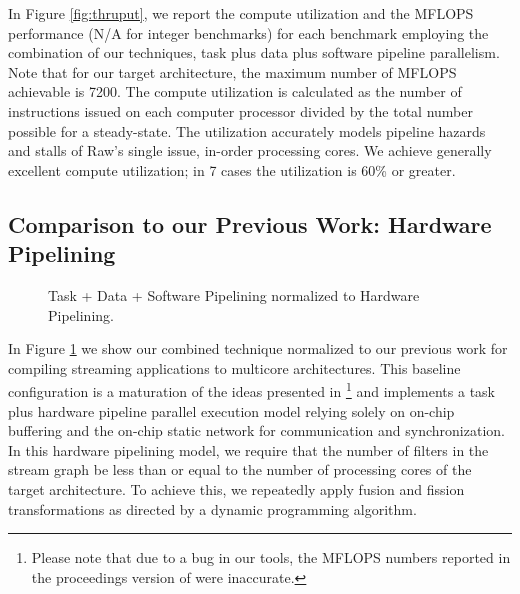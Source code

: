 In Figure \ref{fig:thruput}, we report the compute utilization and the
MFLOPS performance (N/A for integer benchmarks) for each benchmark
employing the combination of our techniques, task plus data plus
software pipeline parallelism. Note that for our target architecture,
the maximum number of MFLOPS achievable is 7200.  The compute
utilization is calculated as the number of instructions issued on each
computer processor divided by the total number possible for a
steady-state.  The utilization accurately models pipeline hazards and
stalls of Raw's single issue, in-order processing cores.  We achieve
generally excellent compute utilization; in 7 cases the utilization is
60\% or greater.


\subsection{Comparison to our Previous Work: Hardware Pipelining}

\begin{figure}[t]
\centering
{}
\caption{Task + Data + Software Pipelining normalized to Hardware Pipelining.
\protect\label{fig:vs-space}}
\vspace{-6pt}
\end{figure}

\begin{figure*}[t]
\centering
{}
\caption{Throughput Speedup Comparison and  Task + Data + Software Pipelining performance results.
\protect\label{fig:thruput}}
\vspace{-6pt}
\end{figure*}
In Figure \ref{fig:vs-space} we show our combined technique normalized
to our previous work for compiling streaming applications to multicore
architectures.  This baseline configuration is a maturation of the
ideas presented in \cite{streamit-asplos}\footnote{Please note that
due to a bug in our tools, the MFLOPS numbers reported in the
proceedings version of \cite{streamit-asplos} were inaccurate.} and
implements a task plus hardware pipeline parallel execution model
relying solely on on-chip buffering and the on-chip static network for
communication and synchronization. In this hardware pipelining model,
we require that the number of filters in the stream graph be less than
or equal to the number of processing cores of the target architecture.
To achieve this, we repeatedly apply fusion and fission
transformations as directed by a dynamic programming algorithm.

